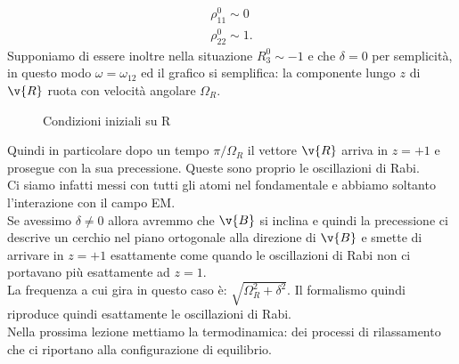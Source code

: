 \[\begin{aligned}
    \rho_{11}^0\sim 0\\
    \rho_{22}^0\sim 1
.\end{aligned}\]
Supponiamo di essere inoltre nella situazione $R_3^0\sim -1$ e che $\delta =0$  per semplicità, in questo modo $\omega = \omega_{12}$ ed il grafico si semplifica: la componente lungo $z$ di $\v{R}$ ruota con velocità angolare $\Omega_R$. 
\begin{figure}[H]
    \centering
    \caption{Condizioni iniziali su R}
    \label{fig:condizioni-iniziali-su-r}
\end{figure}
\noindent
Quindi in particolare dopo un tempo $\pi /\Omega_R$  il vettore $\v{R}$ arriva in $z=+1$ e prosegue con la sua precessione. Queste sono proprio le oscillazioni di Rabi.\\
Ci siamo infatti messi con tutti gli atomi nel fondamentale e abbiamo soltanto l'interazione con il campo EM.\\
Se avessimo $\delta\neq 0$ allora avremmo che $\v{B}$ si inclina e quindi la precessione ci descrive un cerchio nel piano ortogonale alla direzione di $\v{B}$ e smette di arrivare in $z=+1$ esattamente come quando le oscillazioni di Rabi non ci portavano più esattamente ad $z=1$.\\
La frequenza a cui gira in questo caso è: $\sqrt{\Omega_R^2+\delta^2}$. Il formalismo quindi riproduce quindi esattamente le oscillazioni di Rabi.\\
Nella prossima lezione mettiamo la termodinamica: dei processi di rilassamento che ci riportano alla configurazione di equilibrio.

